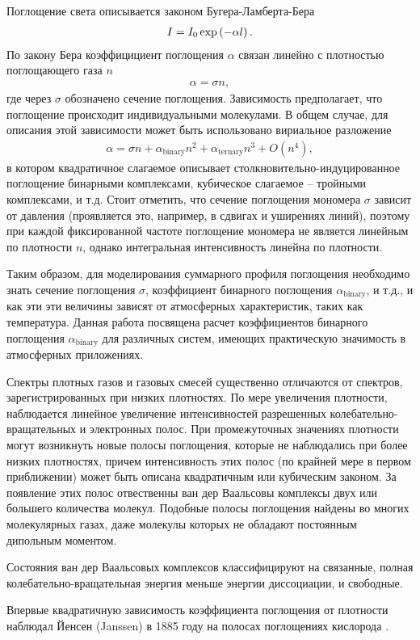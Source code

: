 Поглощение света описывается законом Бугера-Ламберта-Бера 
\begin{gather}
    I = I_0 \exp \left( - \alpha l \right). 
\end{gather}
По закону Бера коэффицициент поглощения $\alpha$ связан линейно с плотностью поглощающего газа $n$
\begin{gather}
    \alpha = \sigma n,
\end{gather}
где через $\sigma$ обозначено сечение поглощения. Зависимость предполагает, что поглощение происходит индивидуальными молекулами. В общем случае, для описания этой зависимости может быть использовано вириальное разложение
\begin{gather}
    \alpha = \sigma n + \alpha_\text{binary} n^2 + \alpha_\text{ternary} n^3 + O(n^4), 
\end{gather}
в котором квадратичное слагаемое описывает столкновительно-индуцированное поглощение бинарными комплексами, кубическое слагаемое -- тройными комплексами, и т.д. Стоит отметить, что сечение поглощения мономера $\sigma$ зависит от давления (проявляется это, например, в сдвигах и уширениях линий), поэтому при каждой фиксированной частоте поглощение мономера не является линейным по плотности $n$, однако интегральная интенсивность линейна по плотности. \par
Таким образом, для моделирования суммарного профиля поглощения необходимо знать сечение поглощения $\sigma$, коэффициент бинарного поглощения $\alpha_\text{binary}$, и т.д., и как эти эти величины зависят от атмосферных характеристик, таких как температура. Данная работа посвящена расчет коэффициентов бинарного поглощения $\alpha_\text{binary}$ для различных систем, имеющих практическую значимость в атмосферных приложениях. \par
Спектры плотных газов и газовых смесей существенно отличаются от спектров, зарегистрированных при низких плотностях. По мере увеличения плотности, наблюдается линейное увеличение интенсивностей разрешенных колебательно-вращательных и электронных полос. При промежуточных значениях плотности могут возникнуть новые полосы поглощения, которые не наблюдались при более низких плотностях, причем интенсивность этих полос (по крайней мере в первом приближении) может быть описана квадратичным или кубическим законом. За появление этих полос отвественны ван дер Ваальсовы комплексы двух или большего количества молекул. Подобные полосы поглощения найдены во многих молекулярных газах, даже молекулы которых не обладают постоянным дипольным моментом.  

Состояния ван дер Ваальсовых комплексов классифицируют на связанные, полная колебательно-вращательная энергия меньше энергии диссоциации, и свободные. 

Впервые квадратичную зависимость коэффициента поглощения от плотности наблюдал Йенсен (Janssen) в 1885 году на полосах поглощениях кислорода \cite{janssen1885}.
\fi
